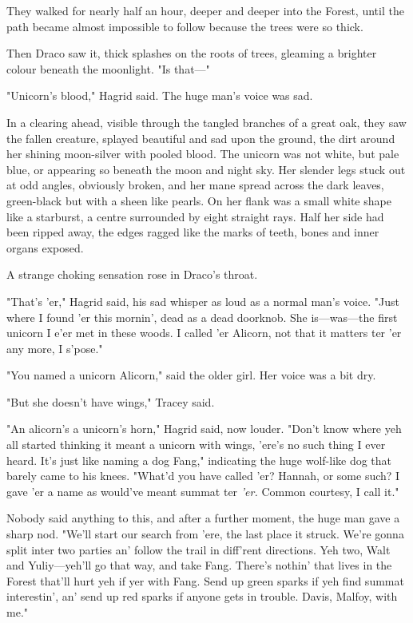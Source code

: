They walked for nearly half an hour, deeper and deeper into the Forest, until
the path became almost impossible to follow because the trees were so thick.

Then Draco saw it, thick splashes on the roots of trees, gleaming a brighter
colour beneath the moonlight. "Is that---"

"Unicorn's blood," Hagrid said. The huge man's voice was sad.

In a clearing ahead, visible through the tangled branches of a great oak, they
saw the fallen creature, splayed beautiful and sad upon the ground, the dirt
around her shining moon-silver with pooled blood. The unicorn was not white,
but pale blue, or appearing so beneath the moon and night sky. Her slender legs
stuck out at odd angles, obviously broken, and her mane spread across the dark
leaves, green-black but with a sheen like pearls. On her flank was a small
white shape like a starburst, a centre surrounded by eight straight rays. Half
her side had been ripped away, the edges ragged like the marks of teeth, bones
and inner organs exposed.

A strange choking sensation rose in Draco's throat.

"That's 'er," Hagrid said, his sad whisper as loud as a normal man's voice.
"Just where I found 'er this mornin', dead as a dead doorknob. She
is---was---the first unicorn I e'er met in these woods. I called 'er Alicorn,
not that it matters ter 'er any more, I s'pose."

"You named a unicorn Alicorn," said the older girl. Her voice was a bit dry.

"But she doesn't have wings," Tracey said.

"An alicorn's a unicorn's horn," Hagrid said, now louder. "Don't know where yeh
all started thinking it meant a unicorn with wings, 'ere's no such thing I ever
heard. It's just like naming a dog Fang," indicating the huge wolf-like dog
that barely came to his knees. "What'd you have called 'er? Hannah, or some
such? I gave 'er a name as would've meant summat ter \emph{'er.} Common
courtesy, I call it."

Nobody said anything to this, and after a further moment, the huge man gave a
sharp nod. "We'll start our search from 'ere, the last place it struck. We're
gonna split inter two parties an' follow the trail in diff'rent directions. Yeh
two, Walt and Yuliy---yeh'll go that way, and take Fang. There's nothin' that
lives in the Forest that'll hurt yeh if yer with Fang. Send up green sparks if
yeh find summat interestin', an' send up red sparks if anyone gets in trouble.
Davis, Malfoy, with me."

